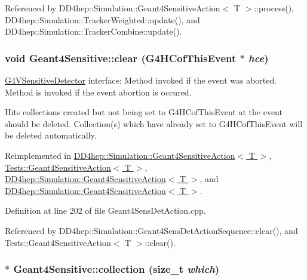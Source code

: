 Referenced by DD4hep::Simulation::Geant4SensitiveAction$<$ T $>$::process(), DD4hep::Simulation::TrackerWeighted::update(), and DD4hep::Simulation::TrackerCombine::update().\hypertarget{class_d_d4hep_1_1_simulation_1_1_geant4_sensitive_a3bb1c2f79261a98e83ec22102281d117}{
\subsubsection[{clear}]{\setlength{\rightskip}{0pt plus 5cm}void Geant4Sensitive::clear (G4HCofThisEvent $\ast$ {\em hce})}}
\label{class_d_d4hep_1_1_simulation_1_1_geant4_sensitive_a3bb1c2f79261a98e83ec22102281d117}


\hyperlink{class_g4_v_sensitive_detector}{G4VSensitiveDetector} interface: Method invoked if the event was aborted. Method is invoked if the event abortion is occured.

Hits collections created but not being set to G4HCofThisEvent at the event should be deleted. Collection(s) which have already set to G4HCofThisEvent will be deleted automatically. 

Reimplemented in \hyperlink{class_d_d4hep_1_1_simulation_1_1_geant4_sensitive_action_a52a9e46a54f3e1605637dc281a878b0d}{DD4hep::Simulation::Geant4SensitiveAction$<$ T $>$}, \hyperlink{class_tests_1_1_geant4_sensitive_action_a4d02434822c244ee5c5d6aee7e15c993}{Tests::Geant4SensitiveAction$<$ T $>$}, \hyperlink{class_d_d4hep_1_1_simulation_1_1_geant4_sensitive_action_aa7ffb4125e622d9eb08bfd4901a643fd}{DD4hep::Simulation::Geant4SensitiveAction$<$ T $>$}, and \hyperlink{class_d_d4hep_1_1_simulation_1_1_geant4_sensitive_action_a686893fef6dd49fb66408e09f1f6de18}{DD4hep::Simulation::Geant4SensitiveAction$<$ T $>$}.

Definition at line 202 of file Geant4SensDetAction.cpp.

Referenced by DD4hep::Simulation::Geant4SensDetActionSequence::clear(), and Tests::Geant4SensitiveAction$<$ T $>$::clear().\hypertarget{class_d_d4hep_1_1_simulation_1_1_geant4_sensitive_a49d2a794d7824475b7bac71d7342306b}{
\subsubsection[{collection}]{ $\ast$ Geant4Sensitive::collection (size\_\-t {\em which})}}
\label{class_d_d4hep_1_1_simulation_1_1_geant4_sensitive_a49d2a794d7824475b7bac71d7342306b}


